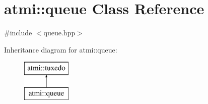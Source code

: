 \hypertarget{classatmi_1_1queue}{}\section{atmi\+:\+:queue Class Reference}
\label{classatmi_1_1queue}


{\ttfamily \#include $<$queue.\+hpp$>$}

Inheritance diagram for atmi\+:\+:queue\+:\begin{figure}[H]
\begin{center}
\leavevmode
\includegraphics[height=2.000000cm]{classatmi_1_1queue}
\end{center}
\end{figure}
